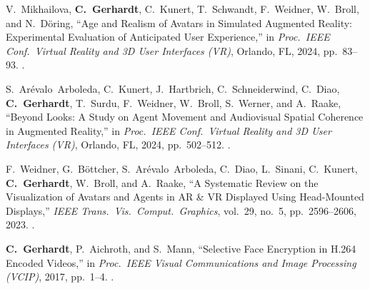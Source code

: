 \begin{enumerate}[label={[\arabic*]}, leftmargin=2em, resume]
\item V.~Mikhailova, \textbf{C.~Gerhardt}, C.~Kunert, T.~Schwandt, F.~Weidner, W.~Broll, and N.~D{\"o}ring,
``Age and Realism of Avatars in Simulated Augmented Reality: Experimental Evaluation of Anticipated User Experience,''
in \emph{Proc.\ IEEE Conf.\ Virtual Reality and 3D User Interfaces (VR)},
Orlando, FL, 2024, pp.~83--93.
.

\item S.~Ar{\'e}valo~Arboleda, C.~Kunert, J.~Hartbrich, C.~Schneiderwind, C.~Diao, \textbf{C.~Gerhardt}, T.~Surdu, F.~Weidner, W.~Broll, S.~Werner, and A.~Raake,
``Beyond Looks: A Study on Agent Movement and Audiovisual Spatial Coherence in Augmented Reality,''
in \emph{Proc.\ IEEE Conf.\ Virtual Reality and 3D User Interfaces (VR)},
Orlando, FL, 2024, pp.~502--512.
.

\item F.~Weidner, G.~B{\"o}ttcher, S.~Ar{\'e}valo~Arboleda, C.~Diao, L.~Sinani, C.~Kunert, \textbf{C.~Gerhardt}, W.~Broll, and A.~Raake,
``A Systematic Review on the Visualization of Avatars and Agents in AR \& VR Displayed Using Head-Mounted Displays,''
\emph{IEEE Trans.\ Vis.\ Comput.\ Graphics}, vol.~29, no.~5, pp.~2596--2606, 2023.
.

\item \textbf{C.~Gerhardt}, P.~Aichroth, and S.~Mann,
``Selective Face Encryption in H.264 Encoded Videos,''
in \emph{Proc.\ IEEE Visual Communications and Image Processing (VCIP)},
2017, pp.~1--4.
.

\end{enumerate}

